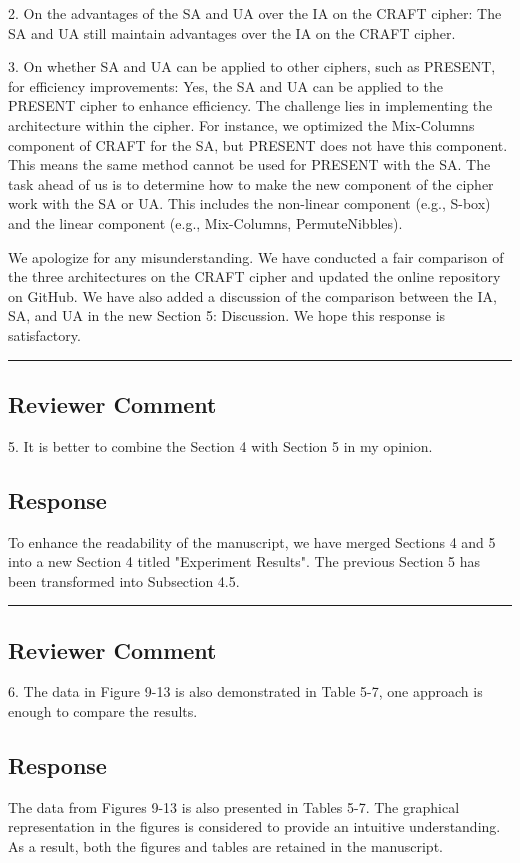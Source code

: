 2. On the advantages of the SA and UA over the IA on the CRAFT cipher: The SA and UA still maintain advantages over the IA on the CRAFT cipher.

3. On whether SA and UA can be applied to other ciphers, such as PRESENT, for efficiency improvements: Yes, the SA and UA can be applied to the PRESENT cipher to enhance efficiency. The challenge lies in implementing the architecture within the cipher. For instance, we optimized the Mix-Columns component of CRAFT for the SA, but PRESENT does not have this component. This means the same method cannot be used for PRESENT with the SA. The task ahead of us is to determine how to make the new component of the cipher work with the SA or UA. This includes the non-linear component (e.g., S-box) and the linear component (e.g., Mix-Columns, PermuteNibbles).

We apologize for any misunderstanding. We have conducted a fair comparison of the three architectures on the CRAFT cipher and updated the online repository on GitHub. We have also added a discussion of the comparison between the IA, SA, and UA in the new Section 5: Discussion. We hope this response is satisfactory.


\noindent\rule{\linewidth}{2.0pt}

\subsection{Reviewer Comment}
5. It is better to combine the Section 4 with Section 5 in my opinion.

\subsection{Response}

To enhance the readability of the manuscript, we have merged Sections 4 and 5 into a new Section 4 titled "Experiment Results". The previous Section 5 has been transformed into Subsection 4.5.

\noindent\rule{\linewidth}{2.0pt}

\subsection{Reviewer Comment}
6. The data in Figure 9-13 is also demonstrated in Table 5-7, one approach is enough to compare the results.

\subsection{Response}

The data from Figures 9-13 is also presented in Tables 5-7. The graphical representation in the figures is considered to provide an intuitive understanding. As a result, both the figures and tables are retained in the manuscript.

